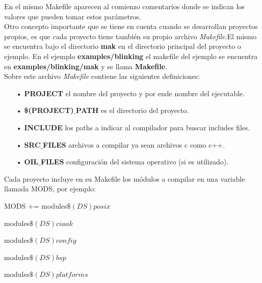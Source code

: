 \documentclass[12pt,letterpaper]{article}
\begin{document}
En el mismo Makefile aparecen al comienzo comentarios donde se indican los valores que pueden tomar estos parámetros.
 \\
 
Otro concepto importante que se tiene en cuenta cuando se desarrollan proyectos propios, es que cada proyecto tiene también su propio archivo \textit{Makefile}.El mismo se encuentra bajo el directorio \textbf{mak} en el directorio principal del proyecto o ejemplo. En el ejemplo \textbf{examples/blinking} el makefile del ejemplo se encuentra en \textbf{examples/blinking/mak} y se llama \textbf{Makefile}.
 \\
 
Sobre este archivo \textit{Makefile} contiene las siguientes definiciones:

\begin{enumerate}
\item[•] \textbf{PROJECT} el nombre del proyecto y por ende nombre del ejecutable.
\item[•] \textbf{\$(PROJECT)$\_$PATH} es el directorio del proyecto.
\item[•] \textbf{INCLUDE} los paths a indicar al compilador para buscar includes files.
\item[•] \textbf{SRC$\_$FILES} archivos a compilar ya sean archivos c como c++.
\item[•] \textbf{OIL$\_$FILES} configuración del sistema operativo (si es utilizado).
\end{enumerate}
Cada proyecto incluye en su Makefile los módulos a compilar en una variable llamada MODS, por ejemplo:

MODS += modules$\$(DS)posix$ \  

        modules$\$(DS)ciaak $\  
        
        modules$\$(DS)config$ \  
        
        modules$\$(DS)bsp $\	
        
        modules$\$(DS)platforms$
 \\
\end{document}
